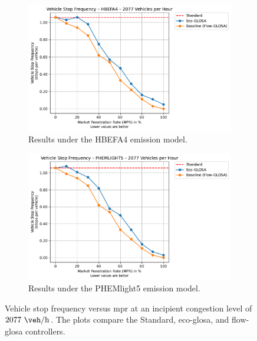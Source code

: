 \begin{figure}[htb]
  \centering
  \begin{subfigure}[b]{0.45\textwidth}
    \includegraphics[width=\textwidth]{data/img/VehicleStopFrequency/VehicleStopFrequency_HBEFA4_Cars2077.pdf}
    \caption{Results under the HBEFA4 emission model.}
    \label{fig:StopFreq_2077_HBEFA4}
  \end{subfigure}\hfill
  \begin{subfigure}[b]{0.45\textwidth}
    \includegraphics[width=\textwidth]{data/img/VehicleStopFrequency/VehicleStopFrequency_PHEMLIGHT5_Cars2077.pdf}
    \caption{Results under the PHEMlight5 emission model.}
    \label{fig:StopFreq_2077_PHEM}
  \end{subfigure}
  \caption[Vehicle stop frequency vs. \ac{mpr} at $2077~\unit{\veh\per\hour}$]{Vehicle stop frequency versus \ac{mpr} at an incipient congestion level of $2077~\unit{\veh\per\hour}$. The plots compare the Standard, \ac{eco-glosa}, and \ac{flow-glosa} controllers.}
  \label{fig:StopFreq_2077}
\end{figure}

